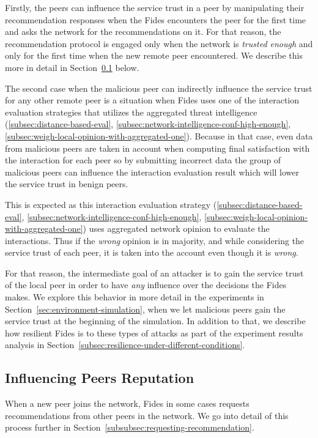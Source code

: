 Firstly, the peers can influence the service trust in a peer by manipulating their recommendation responses when the Fides encounters the peer for the first time and asks the network for the recommendations on it.
For that reason, the recommendation protocol is engaged only when the network is \textit{trusted enough} and only for the first time when the new remote peer encountered. We describe this more in detail in Section~\ref{subsec:influencing-peers-reputation} below.

The second case when the malicious peer can indirectly influence the service trust for any other remote peer is a situation when Fides uses one of the interaction evaluation strategies that utilizes the aggregated threat intelligence (\ref{subsec:distance-based-eval}, \ref{subsec:network-intelligence-conf-high-enough}, \ref{subsec:weigh-local-opinion-with-aggregated-one}).
Because in that case, even data from malicious peers are taken in account when computing final satisfaction with the interaction for each peer so by submitting incorrect data the group of malicious peers can influence the interaction evaluation result which will lower the service trust in benign peers.

This is expected as this interaction evaluation strategy (\ref{subsec:distance-based-eval}, \ref{subsec:network-intelligence-conf-high-enough}, \ref{subsec:weigh-local-opinion-with-aggregated-one}) uses aggregated network opinion to evaluate the interactions.
Thus if the \textit{wrong} opinion is in majority, and while considering the service trust of each peer, it is taken into the account even though it is \textit{wrong}.

For that reason, the intermediate goal of an attacker is to gain the service trust of the local peer in order to have \textit{any} influence over the decisions the Fides makes.
We explore this behavior in more detail in the experiments in Section~\ref{sec:environment-simulation}, when we let malicious peers gain the service trust at the beginning of the simulation. In addition to that, we describe how resilient Fides is to these types of attacks as part of the experiment results analysis in Section~\ref{subsec:resilience-under-different-conditions}.

\subsection{Influencing Peers Reputation}
\label{subsec:influencing-peers-reputation}
When a new peer joins the network, Fides in some cases requests recommendations from other peers in the network.
We go into detail of this process further in Section~\ref{subsubsec:requesting-recommendation}.


